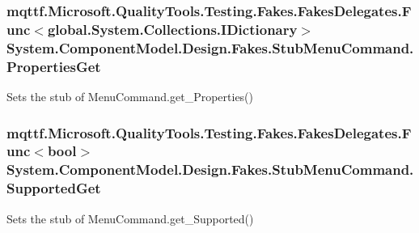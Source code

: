 \hypertarget{class_system_1_1_component_model_1_1_design_1_1_fakes_1_1_stub_menu_command_a80b7b6f424bd206fa04c1d469007a2dc}{
\subsubsection[{Properties\-Get}]{\setlength{\rightskip}{0pt plus 5cm}mqttf.\-Microsoft.\-Quality\-Tools.\-Testing.\-Fakes.\-Fakes\-Delegates.\-Func$<$global.\-System.\-Collections.\-I\-Dictionary$>$ System.\-Component\-Model.\-Design.\-Fakes.\-Stub\-Menu\-Command.\-Properties\-Get}}\label{class_system_1_1_component_model_1_1_design_1_1_fakes_1_1_stub_menu_command_a80b7b6f424bd206fa04c1d469007a2dc}


Sets the stub of Menu\-Command.\-get\-\_\-\-Properties()

\hypertarget{class_system_1_1_component_model_1_1_design_1_1_fakes_1_1_stub_menu_command_a4b504d0c5bdbfda99cea2a27cc7fc680}{
\subsubsection[{Supported\-Get}]{\setlength{\rightskip}{0pt plus 5cm}mqttf.\-Microsoft.\-Quality\-Tools.\-Testing.\-Fakes.\-Fakes\-Delegates.\-Func$<$bool$>$ System.\-Component\-Model.\-Design.\-Fakes.\-Stub\-Menu\-Command.\-Supported\-Get}}\label{class_system_1_1_component_model_1_1_design_1_1_fakes_1_1_stub_menu_command_a4b504d0c5bdbfda99cea2a27cc7fc680}


Sets the stub of Menu\-Command.\-get\-\_\-\-Supported()

